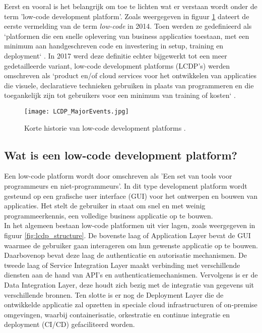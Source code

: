 Eerst en vooral is het belangrijk om toe te lichten wat er verstaan wordt onder de term 'low-code development platform'. Zoals weergegeven in figuur \ref{fig:lcdp_history} dateert de eerste vermelding van de term \textit{low-code} in 2014. Toen werden ze gedefinieerd als `platformen die een snelle oplevering van business applicaties toestaan, met een minimum aan handgeschreven code en investering in setup, training en deployment` \autocite{Ruscio2022}. In 2017 werd deze definitie echter bijgewerkt tot een meer gedetailleerde variant, low-code development platforms (LCDP's) werden omschreven als `product en/of cloud services voor het ontwikkelen van applicaties die visuele, declaratieve technieken gebruiken in plaats van programmeren en die toegankelijk zijn tot gebruikers voor een minimum van training of kosten` \autocite{Ruscio2022}. \\

\begin{figure}[h]
    \centering
    \texttt{[image: LCDP\_MajorEvents.jpg]}
    \caption{Korte historie van low-code development platforms \autocite{Ruscio2022}.}
    \label{fig:lcdp_history}
\end{figure}

\subsection{Wat is een low-code development platform?}
\label{subsec:what_is_low_code}

Een low-code platform wordt door \textcite{Waszkowski2019} omschreven als 'Een set van tools voor programmeurs en niet-programmeurs'. In dit type development platform wordt gesteund op een grafische user interface (GUI) voor het ontwerpen en bouwen van applicaties. Het stelt de gebruiker in staat om snel en met weinig programmeerkennis, een volledige business applicatie op te bouwen. \\

In het algemeen bestaan low-code platformen uit vier lagen, zoals weergegeven in figuur \ref{fig:lcdp_structure}. De bovenste laag of Application Layer bevat de GUI waarmee de gebruiker gaan interageren om hun gewenste applicatie op te bouwen. Daarbovenop bevat deze laag de authenticatie en autorisatie mechanismen. De tweede laag of Service Integration Layer maakt verbinding met verschillende diensten aan de hand van API's en authenticatiemechanismen. Vervolgens is er de Data Integration Layer, deze houdt zich bezig met de integratie van gegevens uit verschillende bronnen. Ten slotte is er nog de Deployment Layer die de ontwikkelde applicatie zal opzetten in speciale cloud infrastructuren of on-premise omgevingen, waarbij containerisatie, orkestratie en continue integratie en deployment (CI/CD) gefaciliteerd worden. \\

